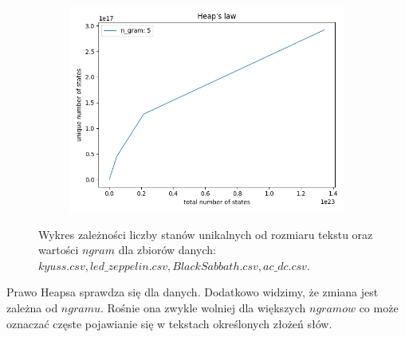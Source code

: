 \documentclass{article}
\begin{document}
\begin{figure}
\begin{subfigure}[b]{0.49\textwidth}
         \includegraphics[width=\textwidth]{heaps5}
         \label{fig:mesh1}
     \end{subfigure}
     \hfill
        \caption{Wykres zależności liczby stanów unikalnych od rozmiaru tekstu oraz wartości $ngram$ dla zbiorów danych: $kyuss.csv, led\_zeppelin.csv, Black Sabbath.csv, ac\_dc.csv$.}
        \label{fig:mesh1}
\end{figure}
\FloatBarrier
Prawo Heapsa sprawdza się dla danych. Dodatkowo widzimy, że zmiana jest zależna od $ngramu$. Rośnie ona zwykle wolniej dla większych $ngramow$ co może oznaczać częste pojawianie się w tekstach określonych złożeń słów.
\end{document}
